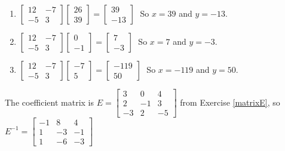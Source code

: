 \begin{enumerate}
\setcounter{enumi}{\value{HW}}

\item $\left[ \begin{array}{rr} 12 & -7 \\ -5 & 3 \end{array} \right] \left[ \begin{array}{r} 26 \\ 39 \end{array} \right] = \left[ \begin{array}{r} 39 \\ -13 \end{array} \right] \;$ So $x = 39$ and $y = -13$.
\item $\left[ \begin{array}{rr} 12 & -7 \\ -5 & 3 \end{array} \right] \left[ \begin{array}{r} 0 \\ -1 \end{array} \right] = \left[ \begin{array}{r} 7 \\ -3 \end{array} \right] \;$ So $x = 7$ and $y = -3$.
\item $\left[ \begin{array}{rr} 12 & -7 \\ -5 & 3 \end{array} \right] \left[ \begin{array}{r} -7 \\ 5 \end{array} \right] = \left[ \begin{array}{r} -119 \\ 50 \end{array} \right] \;$ So $x = -119$ and $y = 50$.

\setcounter{HW}{\value{enumi}}
\end{enumerate}

The coefficient matrix is $E = \left[ \begin{array}{rrr} 3 & 0 & 4 \\ 2 & -1 & 3 \\ -3 & 2 & -5 \end{array} \right]$ from Exercise \ref{matrixE}, so $E^{-1} = \left[ \begin{array}{rrr} -1 & 8 & 4 \\ 1 & -3 & -1 \\ 1 & -6 & -3 \end{array} \right]$ 


